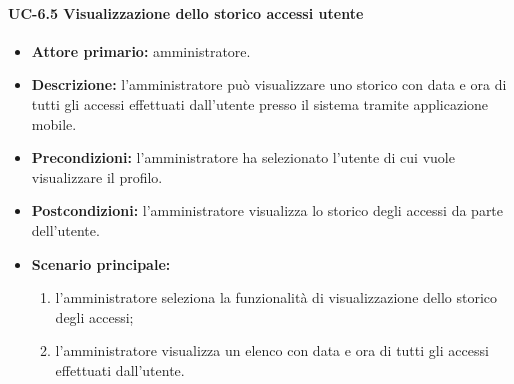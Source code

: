     \paragraph{UC-6.5 Visualizzazione dello storico accessi utente}
    \begin{itemize}
        \item \textbf{Attore primario:} amministratore.
        
        \item \textbf{Descrizione:} l'amministratore può visualizzare uno storico con data e ora di tutti gli accessi effettuati dall'utente presso il sistema tramite applicazione mobile.
        
        \item \textbf{Precondizioni:} l'amministratore ha selezionato l'utente di cui vuole visualizzare il profilo.
    
        \item \textbf{Postcondizioni:} l'amministratore visualizza lo storico degli accessi da parte dell'utente.
    
        \item \textbf{Scenario principale:}
        \begin{enumerate}
            \item  l'amministratore seleziona la funzionalità di visualizzazione dello storico degli accessi;
            \item l'amministratore visualizza un elenco con data e ora di tutti gli accessi effettuati dall'utente.
        \end{enumerate}
    \end{itemize}

